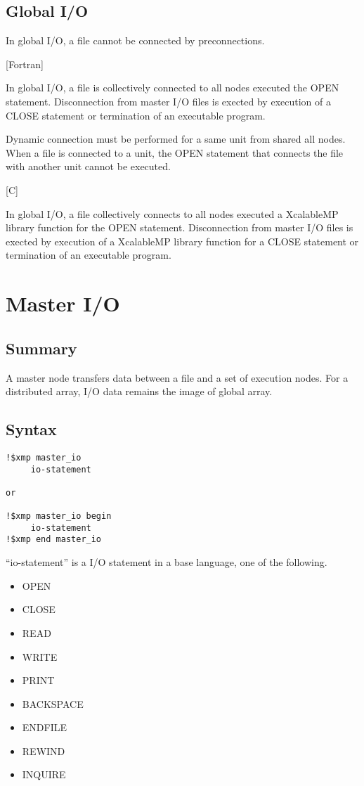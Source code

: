   \subsection{Global I/O}

  In global I/O, a file cannot be connected by preconnections.

  [Fortran]

  In global I/O, a file is collectively connected to all nodes executed the
  OPEN statement.
  Disconnection from master I/O files is exected by execution of a CLOSE
  statement or termination of an executable program.

  Dynamic connection must be performed for a same unit from shared all
  nodes.
  When a file is connected to a unit, the OPEN statement that connects
  the file with another unit cannot be executed.


  [C]

  In global I/O, a file collectively connects to all nodes executed a
  XcalableMP library function for the OPEN statement.
  Disconnection from master I/O files is exected by execution of a
  XcalableMP library function for a CLOSE statement or termination of an
  executable program.
  

  \section{Master I/O}

  \subsection{Summary}
  A master node transfers data between a file and a set of execution nodes.
  For a distributed array, I/O data remains the image of global array.

  \subsection{Syntax}
  \begin{verbatim}
!$xmp master_io
     io-statement

or

!$xmp master_io begin
     io-statement
!$xmp end master_io   
  \end{verbatim}
   
   ``io-statement'' is a I/O statement in a base language, one of the
   following.

   \begin{itemize}
    \item OPEN
    \item CLOSE
    \item READ
    \item WRITE
    \item PRINT
    \item BACKSPACE
    \item ENDFILE
    \item REWIND
    \item INQUIRE
   \end{itemize}

